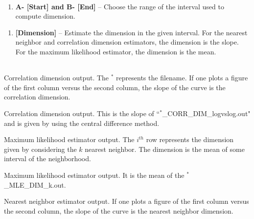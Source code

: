 \documentclass[11pt]{article}
\begin{document}
 \\


\begin{enumerate}[{\bf 7}]
\item {\bf A- [Start] and B- [End]} -- Choose the range of the interval used to compute dimension.
\end{enumerate}


\begin{enumerate}[{\bf 8-}]
\item {\bf [Dimension]} -- Estimate the dimension in the given interval. For the nearest neighbor and
correlation dimension estimators, the dimension is the slope. For the maximum likelihood
estimator, the dimension is the mean. \\
\end{enumerate}


 \\


 Correlation dimension output. The $^{*}$ represents the filename. If one plots a figure of the first column versus the second column, the slope of the curve is the correlation dimension. \\


\begin{sloppypar} Correlation dimension output. This is the slope of ``$^{*}$\_CORR\_DIM\_logvslog.out" and is given by using the central difference method. \\ \end{sloppypar}


 Maximum likelihood estimator output. The $i^{th}$ row represents the dimension given by considering the $k$ nearest neighbor. The dimension is the mean of some interval of the neighborhood. \\


\begin{sloppypar} Maximum likelihood estimator output. It is the mean of the $^{*}$\_MLE\_DIM\_k.out. \\ \end{sloppypar}


 Nearest neighbor estimator output. If one plots a figure of the first column versus the second column, the slope of the curve is the nearest neighbor dimension. \\
\end{document}
